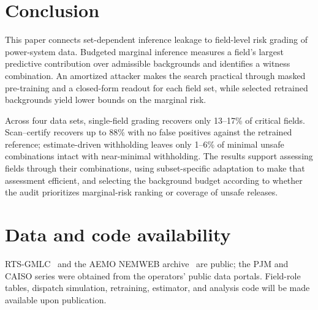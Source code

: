 \section{Conclusion}\label{sec:conclusion}
This paper connects set-dependent inference leakage to field-level risk grading of power-system data. Budgeted marginal inference measures a field's largest predictive contribution over admissible backgrounds and identifies a witness combination. An amortized attacker makes the search practical through masked pre-training and a closed-form readout for each field set, while selected retrained backgrounds yield lower bounds on the marginal risk.

Across four data sets, single-field grading recovers only 13--17\% of critical fields. Scan--certify recovers up to 88\% with no false positives against the retrained reference; estimate-driven withholding leaves only 1--6\% of minimal unsafe combinations intact with near-minimal withholding. The results support assessing fields through their combinations, using subset-specific adaptation to make that assessment efficient, and selecting the background budget according to whether the audit prioritizes marginal-risk ranking or coverage of unsafe releases.

\section*{Data and code availability}
RTS-GMLC~\cite{barrows2020rts} and the AEMO NEMWEB archive~\cite{aemo2024nemweb} are public; the PJM and CAISO series were obtained from the operators' public data portals. Field-role tables, dispatch simulation, retraining, estimator, and analysis code will be made available upon publication.
